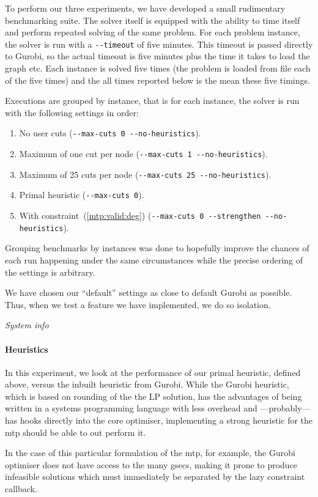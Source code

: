  To perform our three experiments, we have developed a small rudimentary benchmarking suite. The solver
 itself is equipped with the ability to time itself and perform repeated solving of the same problem.
 For each problem instance, the solver is run with a \texttt{-{}-timeout} of five minutes. This timeout
 is passed directly to Gurobi, so the actual timeout is five minutes plus the time it takes to load the
 graph etc. Each instance is solved five times (the problem is loaded from file each of the five times)
 and the all times reported below is the mean these five timings.

 Executions are grouped by instance, that is for each instance, the solver is run with the following
 settings in order:
 \begin{enumerate}
 \item No user cuts (\texttt{-{}-max-cuts 0 -{}-no-heuristics}).
 \item Maximum of one cut per node (\texttt{-{}-max-cuts 1 -{}-no-heuristics}).
 \item Maximum of 25 cuts per node (\texttt{-{}-max-cuts 25 -{}-no-heuristics}).
 \item Primal heuristic (\texttt{-{}-max-cuts 0}).
 \item With constraint~(\ref{mtp:valid:deg}) (\texttt{-{}-max-cuts 0 -{}-strengthen -{}-no-heuristics}).
 \end{enumerate}
 Grouping benchmarks by instances was done to hopefully improve the chances of each run happening
 under the same circumstances while the precise ordering of the settings is arbitrary.

 We have chosen our ``default'' settings as close to default Gurobi as possible. Thus, when we test
 a feature we have implemented, we do so isolation.
 
\textit{System info}

\paragraph{Heuristics}
In this experiment, we look at the performance of our primal heuristic, defined above, versus
the inbuilt heuristic from Gurobi. While the Gurobi heuristic, which is based on rounding
of the the LP solution, has the advantages of being written in a systems programming language
with less overhead and ---probably--- has hooks directly into the core optimiser,
implementing a strong heuristic for the \gls{mtp} should be able to out perform it.

In the case of this particular formulation of the \gls{mtp},
for example, the Gurobi optimiser does not have access to the
many \glspl{gsec}, making it prone to produce infeasible solutions which must immediately
be separated by the lazy constraint callback.

